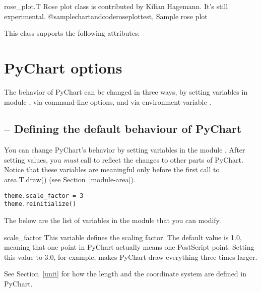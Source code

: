 \documentclass{howto}
\newcommand{\pychart}{PyChart}
\newcommand{\xref}[1]{See Section~\ref{#1}}
\newcommand{\pxref}[1]{see Section~\ref{#1}}
\begin{document}
\begin{classdesc*}{rose_plot.T}
Rose plot class is contributed by Kilian Hagemann. It's still experimental.
@samplechartandcode{roseplottest, Sample rose plot}
\end{classdesc*}

This class supports the following attributes:



\section{PyChart options}\label{options}

The behavior of \pychart{} can be changed in three ways,
by
setting variables in module , via command-line options,
and via environment variable .

\subsection{ -- Defining the default behaviour of PyChart}

You can change \pychart{}'s behavior by setting variables in the module
. After setting values, you \emph{must} call
 to reflect the changes to other parts of
\pychart{}.
Notice that these variables are meaningful only before the first call to
area.T.draw() (\pxref{module-area}).

\begin{verbatim}
theme.scale_factor = 3
theme.reinitialize()
\end{verbatim}

The below are the list of variables in the 
module that you can
modify.

\begin{datadesc}{scale_factor}
This variable defines the scaling factor.
The default value is 1.0, meaning that
one point in \pychart{} actually means one PostScript point.
Setting this value to
3.0, for example, makes \pychart{} draw everything three times larger.

\begin{seealso}
  \xref{unit} for how the length and the coordinate system
  are defined in \pychart{}.
\end{seealso}
\end{datadesc}
\end{document}
